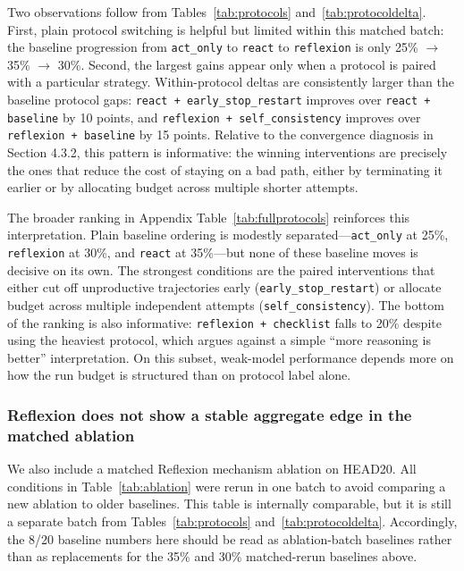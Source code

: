 \documentclass{article}
\begin{document}
Two observations follow from Tables~\ref{tab:protocols} and~\ref{tab:protocoldelta}. First, plain protocol switching is helpful but limited within this matched batch: the baseline progression from \texttt{act\_only} to \texttt{react} to \texttt{reflexion} is only 25\% $\rightarrow$ 35\% $\rightarrow$ 30\%. Second, the largest gains appear only when a protocol is paired with a particular strategy. Within-protocol deltas are consistently larger than the baseline protocol gaps: \texttt{react + early\_stop\_restart} improves over \texttt{react + baseline} by 10 points, and \texttt{reflexion + self\_consistency} improves over \texttt{reflexion + baseline} by 15 points. Relative to the convergence diagnosis in Section 4.3.2, this pattern is informative: the winning interventions are precisely the ones that reduce the cost of staying on a bad path, either by terminating it earlier or by allocating budget across multiple shorter attempts.

The broader ranking in Appendix Table~\ref{tab:fullprotocols} reinforces this interpretation. Plain baseline ordering is modestly separated---\texttt{act\_only} at 25\%, \texttt{reflexion} at 30\%, and \texttt{react} at 35\%---but none of these baseline moves is decisive on its own. The strongest conditions are the paired interventions that either cut off unproductive trajectories early (\texttt{early\_stop\_restart}) or allocate budget across multiple independent attempts (\texttt{self\_consistency}). The bottom of the ranking is also informative: \texttt{reflexion + checklist} falls to 20\% despite using the heaviest protocol, which argues against a simple ``more reasoning is better'' interpretation. On this subset, weak-model performance depends more on how the run budget is structured than on protocol label alone.

\subsubsection{Reflexion does not show a stable aggregate edge in the matched ablation}

We also include a matched Reflexion mechanism ablation on HEAD20. All conditions in Table~\ref{tab:ablation} were rerun in one batch to avoid comparing a new ablation to older baselines. This table is internally comparable, but it is still a separate batch from Tables~\ref{tab:protocols} and~\ref{tab:protocoldelta}. Accordingly, the 8/20 baseline numbers here should be read as ablation-batch baselines rather than as replacements for the 35\% and 30\% matched-rerun baselines above.
\end{document}
